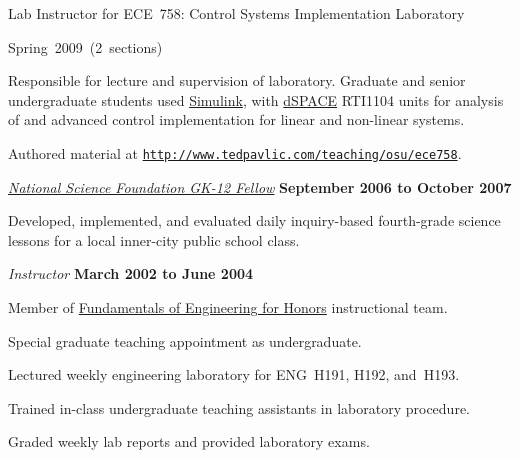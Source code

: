 \documentclass[10pt]{article}
\providecommand*\url[1]{\href{#1}{#1}}
\renewcommand*\url[1]{\href{#1}{\texttt{#1}}}
\begin{document}
\begin{outerlist}
\begin{innerlist}
        \item Lab Instructor for ECE~758: Control Systems Implementation
            Laboratory
        \begin{innerlist}
            \item Spring~2009~(2~sections)


            \item Responsible for lecture and supervision of laboratory.
                Graduate and senior undergraduate students used
                \href{http://www.mathworks.com/products/simulink/}{Simulink},
                with \href{http://www.dspaceinc.com/}{dSPACE} RTI1104
                units for analysis of and advanced control implementation
                for linear and non-linear systems.

            \item Authored material at
                \url{http://www.tedpavlic.com/teaching/osu/ece758}.
        \end{innerlist}
    \end{innerlist}

\item[] \href{http://www.nsfgk12.org/}
        {\emph{National Science Foundation GK-12 Fellow}}
        \hfill \textbf{September 2006 to October 2007}
\begin{innerlist}
    \item[] Developed, implemented, and evaluated daily inquiry-based
        fourth-grade science lessons for a local inner-city public
        school class.
\end{innerlist}

\item[] \textit{Instructor}%
        \hfill \textbf{March 2002 to June 2004}
\begin{innerlist}
\item Member of \href{http://feh.eng.ohio-state.edu/}
                     {Fundamentals of Engineering for Honors}
      instructional team.
\item Special graduate teaching appointment as undergraduate.
\item Lectured weekly engineering laboratory for ENG~H191,
        H192, and~H193.
\item Trained in-class undergraduate teaching assistants in laboratory
        procedure.
\item Graded weekly lab reports and provided laboratory exams.
\end{innerlist}


\end{outerlist}
\end{document}
